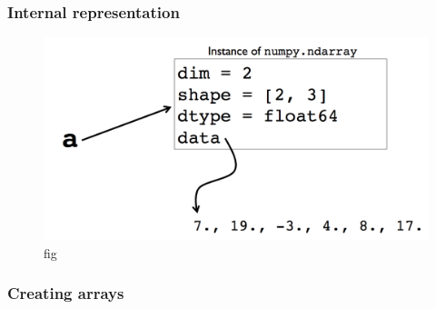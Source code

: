 \documentclass[12pt,letterpaper,twoside]{article}
\begin{document}
\begin{python}
\begin{Highlighting}[]
\end{Highlighting}
\end{python}

\begin{python}
\begin{Highlighting}[]
\end{Highlighting}
\end{python}

\hypertarget{internal-representation}{%
\subsubsection{Internal representation}\label{internal-representation}}

\begin{figure}[h]
\centering
\includegraphics[scale=0.45]{fig/numpy-representation.png}
\caption{fig}
\end{figure}

\hypertarget{creating-arrays}{%
\subsubsection{Creating arrays}\label{creating-arrays}}

\begin{python}
\begin{Highlighting}[]
\OperatorTok{=}\NormalTok{,}\NormalTok{))}
\end{Highlighting}
\end{python}

\begin{python}
\begin{Highlighting}[]
\OperatorTok{=}\NormalTok{,}\NormalTok{))}
\end{Highlighting}
\end{python}
\end{document}
